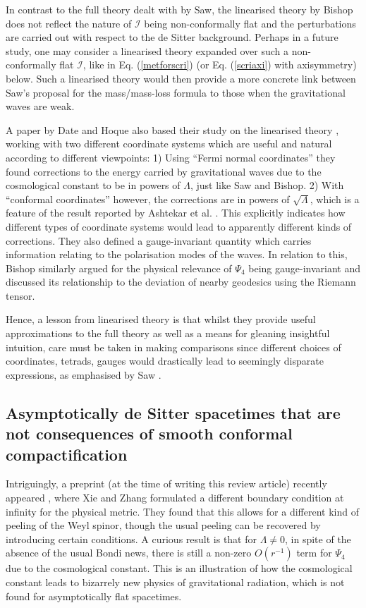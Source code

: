 \documentclass[aps,pre,preprint,superscriptaddress,showpacs,showkeys]{revtex4-1}
\begin{document}
In contrast to the full theory dealt with by Saw, the linearised theory by Bishop does not reflect the nature of $\mathcal{I}$ being non-conformally flat and the perturbations are carried out with respect to the de Sitter background. Perhaps in a future study, one may consider a linearised theory expanded over such a non-conformally flat $\mathcal{I}$, like in Eq. (\ref{metforscri}) (or Eq. (\ref{scriaxi}) with axisymmetry) below. Such a linearised theory would then provide a more concrete link between Saw's proposal for the mass/mass-loss formula to those when the gravitational waves are weak.

A paper by Date and Hoque also based their study on the linearised theory \cite{gracos2}, working with two different coordinate systems which are useful and natural according to different viewpoints: 1) Using ``Fermi normal coordinates'' they found corrections to the energy carried by gravitational waves due to the cosmological constant to be in powers of $\Lambda$, just like Saw and Bishop. 2) With ``conformal coordinates'' however, the corrections are in powers of $\sqrt{\Lambda}$, which is a feature of the result reported by Ashtekar et al. \cite{ash3}. This explicitly indicates how different types of coordinate systems would lead to apparently different kinds of corrections. They also defined a gauge-invariant quantity which carries information relating to the polarisation modes of the waves. In relation to this, Bishop similarly argued for the physical relevance of $\Psi_4$ being gauge-invariant and discussed its relationship to the deviation of nearby geodesics using the Riemann tensor.

Hence, a lesson from linearised theory is that whilst they provide useful approximations to the full theory as well as a means for gleaning insightful intuition, care must be taken in making comparisons since different choices of coordinates, tetrads, gauges would drastically lead to seemingly disparate expressions, as emphasised by Saw \cite{Vee2017c}.

\subsection{Asymptotically de Sitter spacetimes that are not consequences of smooth conformal compactification}

Intriguingly, a preprint (at the time of writing this review article) recently appeared \cite{Zhang}, where Xie and Zhang formulated a different boundary condition at infinity for the physical metric. They found that this allows for a different kind of peeling of the Weyl spinor, though the usual peeling can be recovered by introducing certain conditions. A curious result is that for $\Lambda\neq0$, in spite of the absence of the usual Bondi news, there is still a non-zero $O(r^{-1})$ term for $\Psi_4$ due to the cosmological constant. This is an illustration of how the cosmological constant leads to bizarrely new physics of gravitational radiation, which is not found for asymptotically flat spacetimes.
\end{document}

